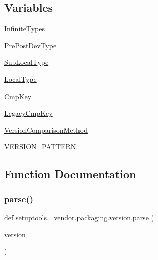\subsection*{Variables}
\begin{DoxyCompactItemize}
\item 
\hyperlink{namespacesetuptools_1_1__vendor_1_1packaging_1_1version_adf4a08c755df6bba96863ad84df5bdee}{Infinite\+Types}
\item 
\hyperlink{namespacesetuptools_1_1__vendor_1_1packaging_1_1version_acacde141d41a590ea7755db678940892}{Pre\+Post\+Dev\+Type}
\item 
\hyperlink{namespacesetuptools_1_1__vendor_1_1packaging_1_1version_a0b6d6df994818cf72a26eb2c0842dd3a}{Sub\+Local\+Type}
\item 
\hyperlink{namespacesetuptools_1_1__vendor_1_1packaging_1_1version_a02f4354cccb41fe4023a8171191baaee}{Local\+Type}
\item 
\hyperlink{namespacesetuptools_1_1__vendor_1_1packaging_1_1version_ae3725fe14d86bc88b1306529a61cc934}{Cmp\+Key}
\item 
\hyperlink{namespacesetuptools_1_1__vendor_1_1packaging_1_1version_a95a19b5ea925901e254e5307d71c6531}{Legacy\+Cmp\+Key}
\item 
\hyperlink{namespacesetuptools_1_1__vendor_1_1packaging_1_1version_a310d1628a9a6d953ffc661437945c7c5}{Version\+Comparison\+Method}
\item 
\hyperlink{namespacesetuptools_1_1__vendor_1_1packaging_1_1version_ac3615951968be8f11cfe5b8d1c90e1a5}{V\+E\+R\+S\+I\+O\+N\+\_\+\+P\+A\+T\+T\+E\+RN}
\end{DoxyCompactItemize}


\subsection{Function Documentation}
\mbox{\label{namespacesetuptools_1_1__vendor_1_1packaging_1_1version_a25610ec48cdc759b4283c76188365c93}} 
\subsubsection{\texorpdfstring{parse()}{parse()}}
{\footnotesize\ttfamily def setuptools.\+\_\+vendor.\+packaging.\+version.\+parse (\begin{DoxyParamCaption}\item[{}]{version }\end{DoxyParamCaption})}

